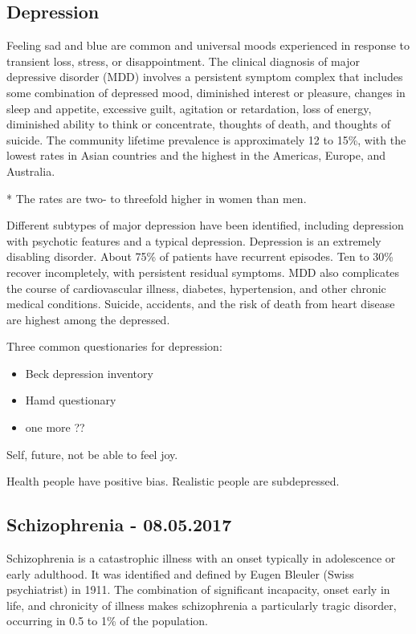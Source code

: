 \documentclass[12pt,article,oneside,a4paper]{memoir}
\begin{document}
\subsection{Depression}

Feeling sad and blue are common and universal moods experienced in response to transient loss, stress, or disappointment. 
The clinical diagnosis of major depressive disorder (MDD) involves a persistent symptom complex that includes some combination of depressed mood, diminished interest or pleasure, changes in sleep and appetite, excessive guilt, agitation or retardation, loss of energy, diminished ability to think or concentrate, thoughts of death, and thoughts of suicide. 
The community lifetime prevalence is approximately 12 to 15\%, with the lowest rates in Asian countries and the highest in the Americas, Europe, and Australia. 

* The rates are two- to threefold higher in women than men.

Different subtypes of major depression have been identified, including depression with psychotic features and a typical depression.
Depression is an extremely disabling disorder. About 75\% of patients have recurrent episodes. Ten to 30\% recover incompletely, with persistent residual symptoms. MDD also complicates the course of cardiovascular illness, diabetes, hypertension, and other chronic medical conditions. Suicide, accidents, and the risk of death from heart disease are highest among the depressed. 

Three common questionaries for depression:
\begin{itemize}
\item Beck depression inventory
\item Hamd questionary
\item one more ??
\end{itemize}

Self, future, not be able to feel joy.

Health people have positive bias. Realistic people are subdepressed.

\newpage
\subsection{Schizophrenia - 08.05.2017}

Schizophrenia is a catastrophic illness with an onset typically in adolescence or early adulthood. It was identified and defined by Eugen Bleuler (Swiss psychiatrist) in 1911. The combination of significant incapacity, onset early in life, and chronicity of illness makes schizophrenia a particularly tragic disorder, occurring in 0.5 to 1\% of the population.
\end{document}
